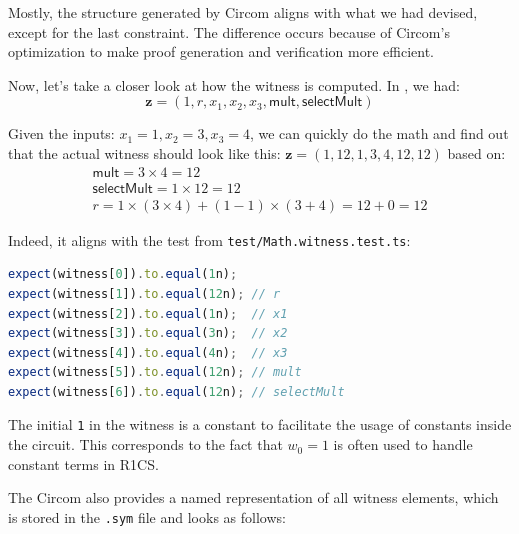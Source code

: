 \documentclass[../lecture-notes-148x210.tex]{subfiles}
\begin{document}
Mostly, the structure generated by Circom aligns with what we had devised, except for the last constraint.
The difference occurs because of Circom's optimization to make proof generation and verification more efficient.

Now, let's take a closer look at how the witness is computed. In , we had:
\[ \mathbf{z} = (1, r, x_1, x_2, x_3, \mathsf{mult}, \mathsf{selectMult}) \]

Given the inputs: $x_1 = 1, x_2 = 3, x_3 = 4$, we can quickly do the math
and find out that the actual witness should look like this: $\mathbf{z} =
(1, 12, 1, 3, 4, 12, 12)$ based on:
\begin{gather*}
    \mathsf{mult} = 3 \times 4 = 12 \\
    \mathsf{selectMult} = 1 \times 12 = 12 \\
    r = 1 \times (3 \times 4) + (1 - 1) \times (3 + 4) = 12 + 0 = 12
\end{gather*}

Indeed, it aligns with the test from \texttt{test/Math.witness.test.ts}:

\begin{center}
    \begin{tcolorbox}[enhanced,
        width=0.75\textwidth,
        title={\textbf{test/Math.witness.test.ts}},
        coltitle=gray!25!black,
        attach boxed title to top center={yshift=-2mm,yshifttext=-1mm},
        boxed title style={size=small,colframe=gray!75!black,
        colback=Green!30!white,boxrule=1pt},
        top=-0.3cm,
        bottom=-0.3cm]
        \begin{lstlisting}[language=TypeScript,numbers=none,basicstyle=\ttfamily\footnotesize]
expect(witness[0]).to.equal(1n);
expect(witness[1]).to.equal(12n); // r
expect(witness[2]).to.equal(1n);  // x1
expect(witness[3]).to.equal(3n);  // x2
expect(witness[4]).to.equal(4n);  // x3
expect(witness[5]).to.equal(12n); // mult
expect(witness[6]).to.equal(12n); // selectMult
        \end{lstlisting}
    \end{tcolorbox}
\end{center}

The initial \texttt{1} in the witness is a constant to facilitate the usage of constants inside the circuit.
This corresponds to the fact that $w_0=1$ is often used to handle constant terms in R1CS.

The Circom also provides a named representation of all witness elements, which is stored in the \texttt{.sym} file and looks as follows:
\end{document}
